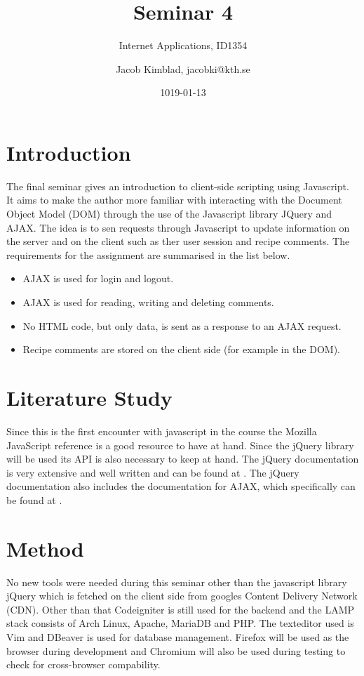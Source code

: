 \documentclass[a4paper]{scrartcl}
\title{Seminar 4}
\subtitle{Internet Applications, ID1354}
\author{Jacob Kimblad, jacobki@kth.se}
\date{1019-01-13}
\begin{document}
\maketitle
\section{Introduction}

The final seminar gives an introduction to client-side scripting using Javascript. It aims to make the author more familiar with interacting with the Document Object Model (DOM) through the use of the Javascript library JQuery and AJAX. The idea is to sen requests through Javascript to update information on the server and on the client such as ther user session and recipe comments. The requirements for the assignment are summarised in the list below.

\begin{itemize}
    \item AJAX is used for login and logout.
    \item AJAX is used for reading, writing and deleting comments.
    \item No HTML code, but only data, is sent as a response to an AJAX request.
    \item Recipe comments are stored on the client side (for example in the DOM).
\end{itemize}

\section{Literature Study}

Since this is the first encounter with javascript in the course the Mozilla JavaScript reference \citet{noauthor_javascript_nodate} is a good resource to have at hand. 
Since the jQuery library will be used its API is also necessary to keep at hand. The jQuery documentation is very extensive and well written and can be found at \citet{js.foundation_jquery_nodate}. 
The jQuery documentation also includes the documentation for AJAX, which specifically can be found at \citet{js.foundation_ajax_nodate}.

\section{Method}
No new tools were needed during this seminar other than the javascript library jQuery which is fetched on the client side from googles Content Delivery Network (CDN). Other than that Codeigniter is still used for the backend and the LAMP stack consists of Arch Linux, Apache, MariaDB and PHP. The texteditor used is Vim and DBeaver is used for database management. Firefox will be used as the browser during development and Chromium will also be used during testing to check for cross-browser compability.
\end{document}
